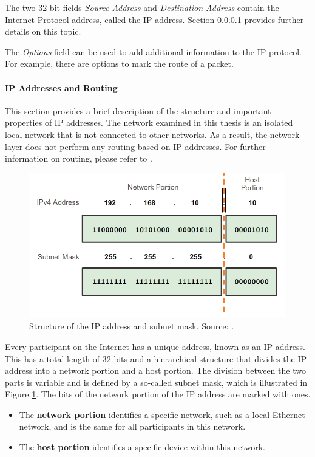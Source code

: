 The two 32-bit fields \textit{Source Address} and \textit{Destination Address} contain the Internet Protocol address, called the IP address. Section \ref{chap:IPandRouting} provides further details on this topic.

The \textit{Options} field can be used to add additional information to the IP protocol. For example, there are options to mark the route of a packet.


\paragraph{IP Addresses and Routing} \label{chap:IPandRouting}

This section provides a brief description of the structure and important properties of IP addresses. The network examined in this thesis is an isolated local network that is not connected to other networks. As a result, the network layer does not perform any routing based on IP addresses. For further information on routing, please refer to \cite{Tanenbaum2010}.

\begin{figure}[h]
    \centering
    \includegraphics[width=0.8\linewidth]{figures/tcpip_refmodel/image8.png}
    \caption[Structure of the IP address and subnet mask]{Structure of the IP address and subnet mask. Source: \cite{CSE252ImageSubnet}.}
    \label{fig:IPSubnet}
\end{figure}

Every participant on the Internet has a unique address, known as an IP address. This has a total length of 32 bits and a hierarchical structure that divides the IP address into a network portion and a host portion. The division between the two parts is variable and is defined by a so-called subnet mask, which is illustrated in Figure \ref{fig:IPSubnet}. The bits of the network portion of the IP address are marked with ones.

\begin{itemize}
\item The \textbf{network portion} identifies a specific network, such as a local Ethernet network, and is the same for all participants in this network.
\item The \textbf{host portion} identifies a specific device within this network.
\end{itemize}

